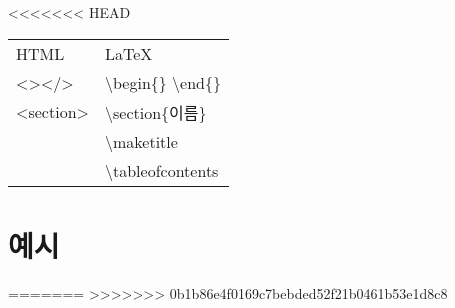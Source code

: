 \documentclass{beamer}
\begin{document}
<<<<<<< HEAD
\begin{frame}
    \begin{table}[]
        \begin{tabular}{ll}
            HTML                                               & \LaTeX                                            \\
            \textless{}\textgreater \textless{}/\textgreater{} & \textbackslash{}begin\{\} \textbackslash{}end\{\} \\
            \textless{}section\textgreater{}                   & \textbackslash{}section\{이름\}                     \\
                                                               & \textbackslash{}maketitle                         \\
                                                               & \textbackslash{}tableofcontents
        \end{tabular}
    \end{table}
\end{frame}

\section{예시}
\begin{frame}
    
\end{frame}
=======
>>>>>>> 0b1b86e4f0169c7bebded52f21b0461b53e1d8c8
\end{document}
